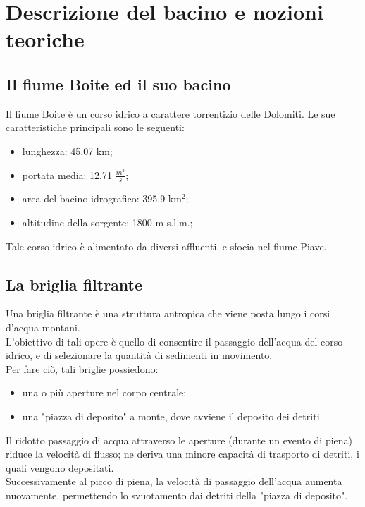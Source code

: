 \section{Descrizione del bacino e nozioni teoriche}

\subsection{Il fiume Boite ed il suo bacino}
Il fiume Boite è un corso idrico a carattere torrentizio delle Dolomiti. Le sue caratteristiche principali sono le seguenti:
\begin{itemize}
    \item lunghezza: 45.07 km;
    \item portata media: 12.71 $\frac{m^3}{s}$;
    \item area del bacino idrografico: 395.9 km$^2$;
    \item altitudine della sorgente: 1800 m s.l.m.;
\end{itemize}
Tale corso idrico è alimentato da diversi affluenti, e sfocia nel fiume Piave.
\cite{fiume_boite}
\subsection{La briglia filtrante}
Una briglia filtrante è una struttura antropica che viene posta lungo i corsi d'acqua montani.\\
L'obiettivo di tali opere è quello di consentire il passaggio dell'acqua del corso idrico, e di selezionare la quantità di sedimenti in movimento.\\
Per fare ciò, tali briglie possiedono:
\begin{itemize}
    \item una o più aperture nel corpo centrale;
    \item una "piazza di deposito" a monte, dove avviene il deposito dei detriti.
\end{itemize} 
Il ridotto passaggio di acqua attraverso le aperture (durante un evento di piena) riduce la velocità di flusso; ne deriva una minore capacità di trasporto di detriti, i quali vengono depositati.
\cite{prov_bolz}\\
Successivamente al picco di piena, la velocità di passaggio dell'acqua aumenta nuovamente, permettendo lo svuotamento dai detriti della "piazza di deposito".


